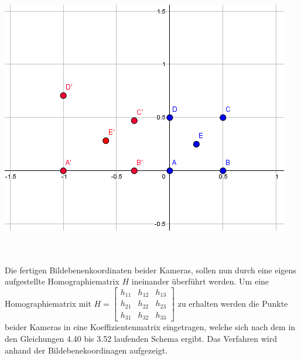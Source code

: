 \begin{minipage}{\linewidth}
	\centering
	\includegraphics[width=0.8\linewidth]{images/Geogebra.png}
	\label{ErgebniseHomographie1}
\end{minipage}\\ \\

Die fertigen Bildebenenkoordinaten beider Kameras, sollen nun durch eine eigens aufgestellte Homographiematrix $H$ ineinander überführt werden. Um eine Homographiematrix mit 
$H=
\begin{bmatrix}
h_{11}&h_{12}&h_{13}\\
h_{21}&h_{22}&h_{23}\\
h_{31}&h_{32}&h_{33}
\end{bmatrix}
$ zu erhalten werden die Punkte beider Kameras in eine Koeffizientenmatrix eingetragen, welche sich nach dem in den Gleichungen 4.40 bis 3.52 laufenden Schema ergibt. Das Verfahren wird anhand der Bildebenekoordinagen aufgezeigt.

